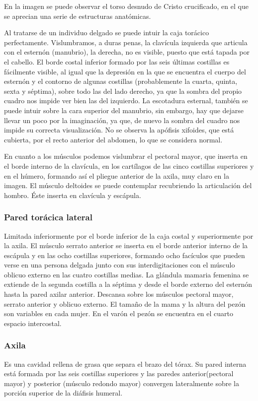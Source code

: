 \documentclass[a4paper,12pt]{article} %
\begin{document}
En la imagen se puede observar el torso desnudo de Cristo crucificado, en el que se aprecian una serie de estructuras anatómicas. 

Al tratarse de un individuo delgado se puede intuir la caja torácico perfectamente. Vislumbramos, a duras penas, la clavícula izquierda que articula con el esternón (manubrio), la derecha, no es visible, puesto que está tapada por el cabello. El borde costal inferior formado por las seis últimas costillas es fácilmente visible, al igual que la depresión en la que se encuentra el cuerpo del esternón y el contorno de algunas costillas (probablemente la cuarta, quinta, sexta y séptima), sobre todo las del lado derecho, ya que la sombra del propio cuadro nos  impide ver bien las del izquierdo. La escotadura esternal, también se puede intuir sobre la cara superior del manubrio, sin embargo, hay que dejarse llevar un poco por la imaginación, ya que, de nuevo la sombra del cuadro nos impide su correcta visualización. No se observa la apófisis xifoides, que está cubierta, por el recto anterior del abdomen, lo que se considera normal.

En cuanto a los músculos podemos vislumbrar el pectoral mayor, que inserta en el borde interno de la clavícula, en los cartílagos de las cinco costillas superiores y en el húmero, formando así el pliegue anterior de la axila, muy claro en la imagen. El músculo deltoides se puede contemplar recubriendo la articulación del hombro. Éste inserta en clavícula y escápula.

\subsubsection{Pared torácica lateral}
Limitada inferiormente por el borde inferior de la caja costal y superiormente por la axila.
El músculo serrato anterior se inserta en el borde anterior interno de la escápula y en las ocho costillas superiores, formando ocho facículos que pueden verse en una persona delgada junto con sus interdigitaciones con el músculo oblicuo externo en las cuatro costillas medias.
La glándula mamaria femenina se extiende de la segunda costilla a la séptima y desde el borde externo del esternón hasta la pared axilar anterior. Descansa sobre los músculos  pectoral mayor, serrato anterior y oblicuo externo. El tamaño de la mama y la altura del pezón son variables en cada mujer. En el varón el pezón se encuentra en el cuarto espacio intercostal.

\subsubsection{Axila}
Es una cavidad rellena de grasa que separa el brazo del tórax. Su pared interna está formada por las seis costillas superiores y las paredes anterior(pectoral mayor) y posterior (músculo redondo mayor) convergen lateralmente sobre la porción superior de la diáfisis humeral.
\end{document}
